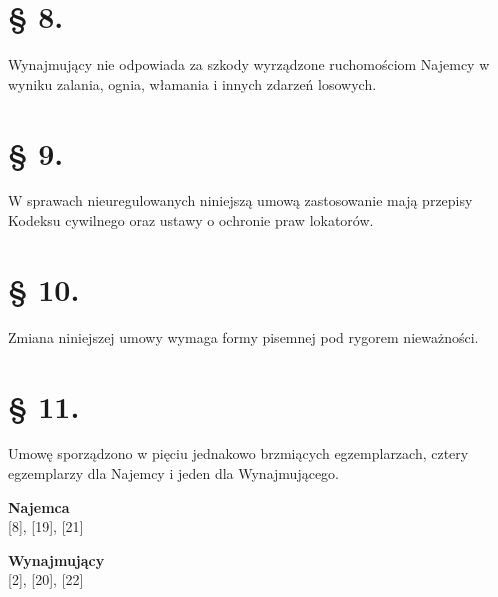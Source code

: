 \documentclass[a4paper,11pt, notitlepage]{article}
\begin{document}
   
\section*{§ 8.}
Wynajmujący nie odpowiada za szkody wyrządzone ruchomościom Najemcy w wyniku zalania, ognia, włamania i innych zdarzeń losowych.
\section*{§ 9.}
W sprawach nieuregulowanych niniejszą umową zastosowanie mają przepisy Kodeksu cywilnego oraz ustawy o ochronie praw lokatorów.
\section*{§ 10.}
Zmiana niniejszej umowy wymaga formy pisemnej pod rygorem nieważności.
\section*{§ 11.}
Umowę sporządzono w pięciu jednakowo brzmiących egzemplarzach, cztery egzemplarzy dla Najemcy i jeden dla Wynajmującego.

\newline
\vspace{40pt}
\Large{\textbf{Najemca}} \\

[8], [19], [21]

\newline
\vspace{60pt}
\Large{\textbf{Wynajmujący}}\\

[2], [20], [22]
\end{document}
